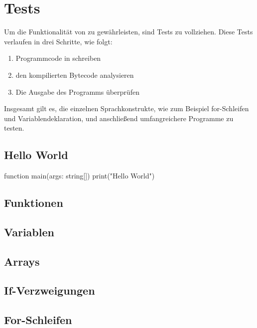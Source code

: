 \chapter{Tests}
\label{cha:tests}

Um die Funktionalität von \toya zu gewährleisten, sind Tests zu vollziehen. Diese Tests verlaufen in drei Schritte, wie folgt:
\begin{enumerate}
    \item Programmcode in \toya schreiben
    \item den kompilierten Bytecode analysieren
    \item Die Ausgabe des Programms überprüfen
\end{enumerate}

Insgesamt gilt es, die einzelnen Sprachkonstrukte, wie zum Beispiel for-Schleifen und Variablendeklaration, und anschließend umfangreichere Programme zu testen.

\section{Hello World}

\begin{ToyaCode}[numbers=none, caption={Hello World}]
function main(args: string[]) {
    print("Hello World")
}
\end{ToyaCode}

\section{Funktionen}

\section{Variablen}

\section{Arrays}

\section{If-Verzweigungen}

\section{For-Schleifen}